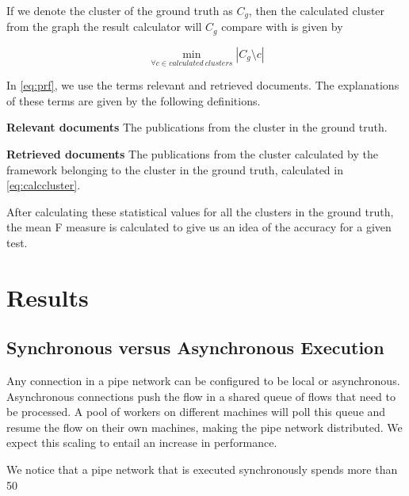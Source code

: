 If we denote the cluster of the ground truth as $C_g$, then the calculated cluster from the graph the result calculator will $C_g$ compare with is given by 

\begin{equation}
	\label{eq:calccluster}
	\min_{\forall c \in calculated~clusters}{\left| C_g \setminus c \right|}
\end{equation}

In \autoref{eq:prf}, we use the terms relevant and retrieved documents. The explanations of these terms are given by the following definitions.

\begin{mydef}
	\textbf{Relevant documents} The publications from the cluster in the ground truth.
\end{mydef}

\begin{mydef}
	\textbf{Retrieved documents} The publications from the cluster calculated by the framework belonging to the cluster in the ground truth, calculated in \autoref{eq:calccluster}.
\end{mydef}

After calculating these statistical values for all the clusters in the ground truth, the mean F measure is calculated to give us an idea of the accuracy for a given test.

\section{Results}

\subsection{Synchronous versus Asynchronous Execution}

Any connection in a pipe network can be configured to be local or asynchronous. Asynchronous connections push the flow in a shared queue of flows that need to be processed. A pool of workers on different machines will poll this queue and resume the flow on their own machines, making the pipe network distributed. We expect this scaling to entail an increase in performance.

We notice that a pipe network that is executed synchronously spends more than 50%

